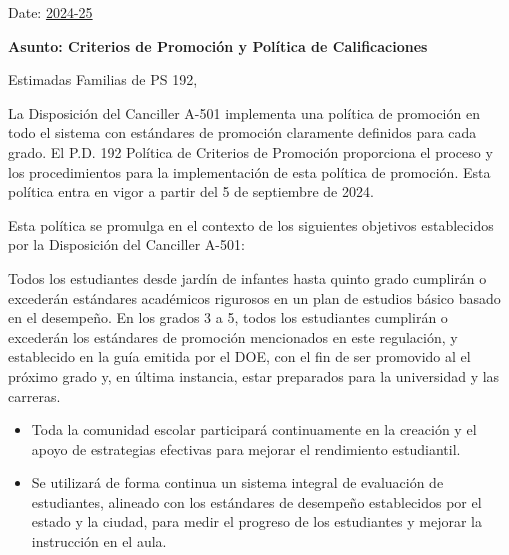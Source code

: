 \documentclass[12pt,letterpaper]{article}
\begin{document}
\vspace*{0.5in}
Date: \href{https://www.ps192.org}{2024-25} 

\textbf{Asunto: Criterios de Promoción y Política de Calificaciones}

Estimadas Familias de PS 192,

La Disposición del Canciller A-501 implementa una política de promoción en todo el sistema con estándares de promoción claramente definidos para cada grado. El P.D. 192 Política de Criterios de Promoción proporciona el proceso y los procedimientos para la implementación de esta política de promoción. Esta política entra en vigor a partir del 5 de septiembre de 2024. 

Esta política se promulga en el contexto de los siguientes objetivos establecidos por la Disposición del Canciller A-501:

Todos los estudiantes desde jardín de infantes hasta quinto grado cumplirán o excederán estándares académicos rigurosos en un plan de estudios básico basado en el desempeño. En los grados 3 a 5, todos los estudiantes cumplirán o excederán los estándares de promoción mencionados en este regulación, y establecido en la
guía emitida por el DOE, con el fin de ser promovido al el próximo grado y, en
última instancia, estar preparados para la universidad y las carreras.
\begin{itemize}
\item Toda la comunidad escolar participará continuamente en la creación y el apoyo de estrategias efectivas para mejorar el rendimiento estudiantil.
\item Se utilizará de forma continua un sistema integral de evaluación de estudiantes, alineado con los estándares de desempeño establecidos por el estado y la ciudad, para medir el progreso de los estudiantes y mejorar la instrucción en el aula.
\end{itemize}
\end{document}
